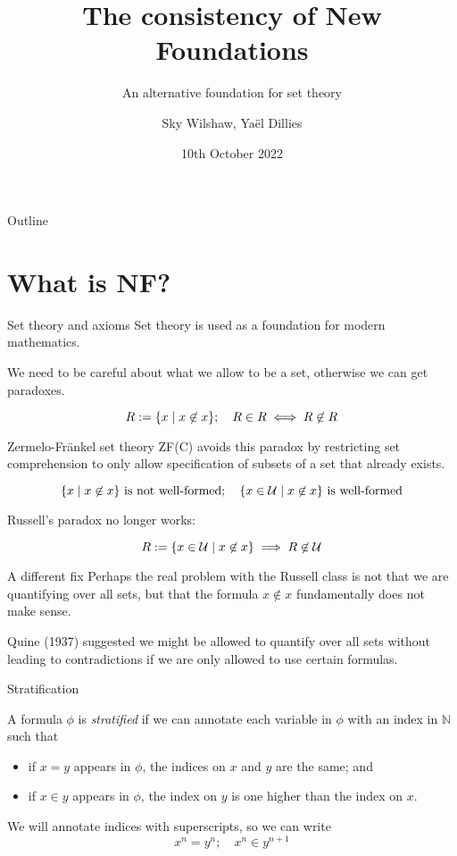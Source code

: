 \documentclass[xcolor=dvipsnames]{beamer}
\title{The consistency of New Foundations}
\subtitle{An alternative foundation for set theory}
\author{Sky Wilshaw, Ya\"el Dillies}
\institute{University of Cambridge}
\date{10th October 2022}
\begin{document}
\begin{frame}
    \titlepage
\end{frame}

\begin{frame}{Outline}
    \tableofcontents[hideallsubsections]
\end{frame}

\section{What is NF?}

\begin{frame}{Set theory and axioms}
    Set theory is used as a foundation for modern mathematics.

    \medskip

    We need to be careful about what we allow to be a set, otherwise we can get paradoxes.

    \[ R := \qty{x\mid x\not\in x};\quad R \in R \iff R \not\in R \]
\end{frame}
\begin{frame}{Zermelo-Fr\"ankel set theory}
    ZF(C) avoids this paradox by restricting set comprehension to only allow specification of subsets of a set that already exists.

    \[ \qty{x\mid x \not\in x} \text{ is not well-formed};\quad \qty{x\in \mathcal U\mid x \not\in x} \text{ is well-formed} \]

    Russell's paradox no longer works:

    \[ R := \qty{x\in\mathcal U\mid x \not\in x} \implies R \not\in \mathcal U \]
\end{frame}
\begin{frame}{A different fix}
    Perhaps the real problem with the Russell class is not that we are quantifying over all sets, but that the formula \( x \not\in x \) fundamentally does not make sense.

    \medskip

    Quine (1937) suggested we might be allowed to quantify over all sets without leading to contradictions if we are only allowed to use certain formulas.
\end{frame}
\begin{frame}{Stratification}
    \begin{definition}
        A formula \( \phi \) is \emph{stratified} if we can annotate each variable in \( \phi \) with an index in \( \mathbb N \) such that
        \begin{itemize}
            \item if \( x = y \) appears in \( \phi \), the indices on \( x \) and \( y \) are the same; and
            \item if \( x \in y \) appears in \( \phi \), the index on \( y \) is one higher than the index on \( x \).
        \end{itemize}
    \end{definition}
    We will annotate indices with superscripts, so we can write
    \[ x^n = y^n;\quad x^n \in y^{n+1} \]
\end{frame}
\end{document}
